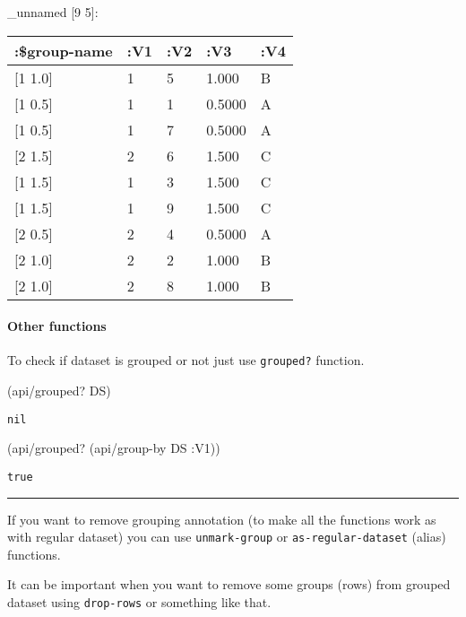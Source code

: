\documentclass[]{article}
\newenvironment{Shaded}{\begin{snugshade}}{\end{snugshade}}
\newcommand{\AttributeTok}[1]{\textcolor[rgb]{0.77,0.63,0.00}{#1}}
\newcommand{\NormalTok}[1]{#1}
\let\oldparagraph\paragraph
\renewcommand{\paragraph}[1]{\oldparagraph{#1}\mbox{}}
\begin{document}
\_unnamed {[}9 5{]}:

\begin{longtable}[]{@{}lllll@{}}
\toprule
:\$group-name & :V1 & :V2 & :V3 & :V4\tabularnewline
\midrule
\endhead
{[}1 1.0{]} & 1 & 5 & 1.000 & B\tabularnewline
{[}1 0.5{]} & 1 & 1 & 0.5000 & A\tabularnewline
{[}1 0.5{]} & 1 & 7 & 0.5000 & A\tabularnewline
{[}2 1.5{]} & 2 & 6 & 1.500 & C\tabularnewline
{[}1 1.5{]} & 1 & 3 & 1.500 & C\tabularnewline
{[}1 1.5{]} & 1 & 9 & 1.500 & C\tabularnewline
{[}2 0.5{]} & 2 & 4 & 0.5000 & A\tabularnewline
{[}2 1.0{]} & 2 & 2 & 1.000 & B\tabularnewline
{[}2 1.0{]} & 2 & 8 & 1.000 & B\tabularnewline
\bottomrule
\end{longtable}

\paragraph{Other functions}\label{other-functions}

To check if dataset is grouped or not just use \texttt{grouped?}
function.

\begin{Shaded}
\begin{Highlighting}[]
\NormalTok{(api/grouped? DS)}
\end{Highlighting}
\end{Shaded}

\begin{verbatim}
nil
\end{verbatim}

\begin{Shaded}
\begin{Highlighting}[]
\NormalTok{(api/grouped? (api/group-by DS }\AttributeTok{:V1}\NormalTok{))}
\end{Highlighting}
\end{Shaded}

\begin{verbatim}
true
\end{verbatim}

\begin{center}\rule{0.5\linewidth}{0.5pt}\end{center}

If you want to remove grouping annotation (to make all the functions
work as with regular dataset) you can use \texttt{unmark-group} or
\texttt{as-regular-dataset} (alias) functions.

It can be important when you want to remove some groups (rows) from
grouped dataset using \texttt{drop-rows} or something like that.
\end{document}
